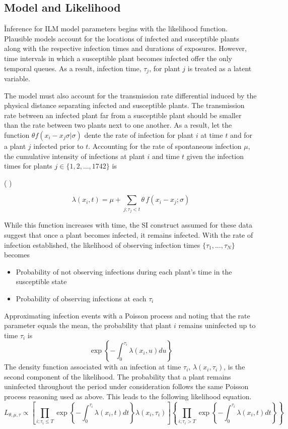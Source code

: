 \documentclass{uwstat572}
\newcommand{\vmadd}[1]{\textbf{\color{red}{#1}}}
\newcommand{\vmcomment}[1]{({\color{blue}{VM's comment:}} \textbf{\color{blue}{#1}})}
\begin{document}
\subsection{Model and Likelihood}
\v
Inference for ILM model parameters begins with the likelihood function. 
Plausible models account for the locations of infected and susceptible plants along with the respective infection times and durations of exposures. 
However, time intervals in which a susceptible plant becomes infected offer the only temporal queues. 
As a result, infection time, $\tau_j$, for plant $j$ is treated as a latent variable. 

The model must also account for the transmission rate differential induced by the physical distance separating infected and susceptible plants. 
The transmission rate between an infected plant far from a susceptible plant should be smaller than the rate between two plants next to one another.
As a result, let the function $\theta f(x_i -x_j \sigma | \sigma)$ dente the rate of infection for plant $i$ at time $t$ and for a plant $j$ infected prior to $t$. 
Accounting for the rate of spontaneous infection $\mu$, the cumulative intensity of infections at plant $i$ and time $t$ given the infection times for plants $j \in \{1, 2, \dots, 1742\}$ is 

\vmcomment{Try to rewrite it now with CTMC generating process.}

$$ \lambda(x_i,t) = \mu + \sum_{j; \tau_j<t} \theta \, f(x_i - x_j; \sigma)$$\vmadd{.}

While this function increases with time, the SI construct assumed for these data suggest that once a plant becomes infected, it remains infected. 
With the rate of infection established, the likelihood of observing infection times $\{\tau_1, \dots, \tau_N\}$ becomes
\begin{itemize}
\item Probability of not observing infections during each plant's time in the susceptible state 
\item Probability of observing infections at each $\tau_i$
\end{itemize}
Approximating infection events with a Poisson process and noting that the rate parameter equals the mean, the probability that plant $i$ remains uninfected up to time $\tau_i$ is 
$$ \exp \left\{- \int^{\tau_i}_{0} \lambda(x_i, u) du \right\}$$
The density function associated with an infection at time $\tau_i$, $\lambda(x_i, \tau_i)$, is the second component of the likelihood. 
The probability that a plant remains uninfected throughout the period under consideration follows the same Poisson process reasoning used as above. 
This leads to the following likelihood equation. 
\begin{equation} L_{\theta, \mu, \tau} \propto \left[ \prod_{i;\tau_i \le T} \exp \left\{-\int^{\tau_i}_0 \lambda(x_i, t)dt\right \} \lambda(x_i, \tau_i)\right] \left\{ \prod_{i;\tau_i > T} \exp \left\{-\int^{\tau_i}_0 \lambda(x_i, t)dt\right \}\right\} \end{equation}
\end{document}

